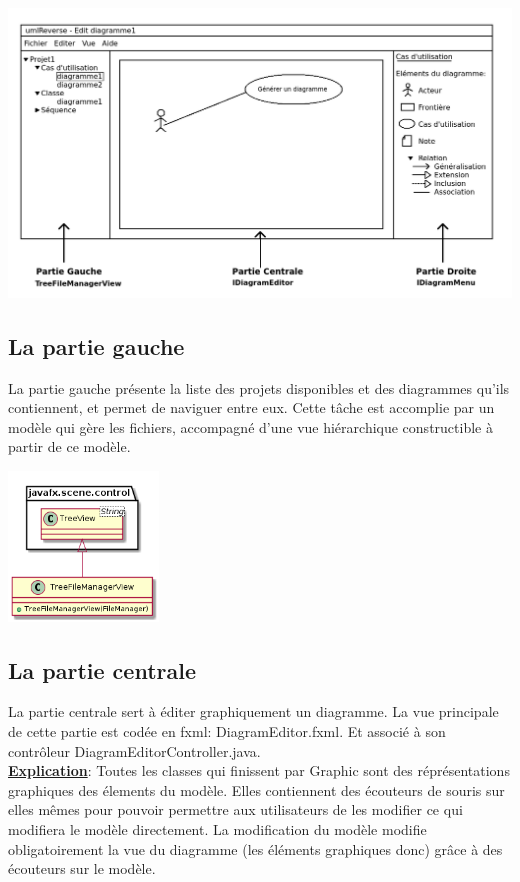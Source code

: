 \documentclass[a4paper,10pt]{article}
\begin{document}
    \begin{center}
	\includegraphics[width=\textwidth]{Image/maquette.png}
    \end{center}

  \subsection{La partie gauche}
    La partie gauche présente la liste des projets disponibles et des diagrammes qu’ils contiennent, et permet de naviguer entre eux. 
    Cette tâche est accomplie par un modèle qui gère les fichiers, accompagné d’une vue hiérarchique constructible à partir de ce modèle.
    
    \begin{center}
	\includegraphics[width=4cm]{Image/partieGaucheVue.png}
    \end{center}
  \subsection{La partie centrale}
    La partie centrale sert à éditer graphiquement un diagramme. La vue principale de cette partie est codée en fxml: DiagramEditor.fxml. Et
    associé à son contrôleur DiagramEditorController.java.\\
    
    \textbf{\underline{Explication}}: Toutes les classes qui finissent par Graphic sont des réprésentations graphiques des élements du modèle. Elles contiennent
    des écouteurs de souris sur elles mêmes pour pouvoir permettre aux utilisateurs de les modifier ce qui modifiera le modèle directement.
    La modification du modèle modifie obligatoirement la vue du diagramme (les éléments graphiques donc) grâce à des écouteurs sur le modèle.
    
\end{document}
